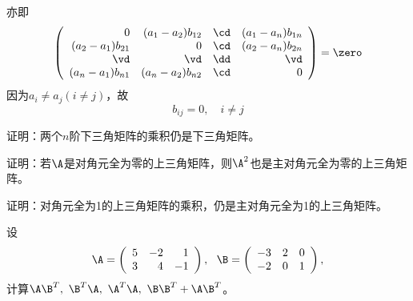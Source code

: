 \begin{frame}
  \begin{footnotesize}
    亦即
    $$
    \left(
    \begin{array}{rrrr}
      0&(a_1-a_2)b_{12}&\cd&(a_1-a_n)b_{1n}\\
      (a_2-a_1)b_{21}&0&\cd&(a_2-a_n)b_{2n}\\
      \vd&\vd&\dd&\vd\\
      (a_n-a_1)b_{n1}&(a_n-a_2)b_{n2}&\cd&0
    \end{array}
    \right)=\zero
    $$
    因为$a_i\ne a_j(i\ne j)$，故
    $$
    b_{ij}=0, \quad i\ne j
    $$
  \end{footnotesize}
\end{frame}

\begin{frame}
  \begin{footnotesize}
    \begin{exampleblock}{30}
      证明：两个$n$阶下三角矩阵的乘积仍是下三角矩阵。
    \end{exampleblock}
  \end{footnotesize}
\end{frame}



\begin{frame}
  \begin{footnotesize}
    \begin{exampleblock}{31}
      证明：若$\A$是对角元全为零的上三角矩阵，则$\A^2$也是主对角元全为零的上三角矩阵。
    \end{exampleblock}
  \end{footnotesize}
\end{frame}



\begin{frame}
  \begin{footnotesize}
    \begin{exampleblock}{32}
      证明：对角元全为1的上三角矩阵的乘积，仍是主对角元全为1的上三角矩阵。
    \end{exampleblock}
  \end{footnotesize}
\end{frame}


\begin{frame}
  \begin{footnotesize}
    \begin{exampleblock}{33}
      设$$\A=\left(
      \begin{array}{rrr}
        5&-2&1\\
        3&4&-1
      \end{array}
      \right),~~\B=\left(
      \begin{array}{rrr}
        -3&2&0\\
        -2&0&1
      \end{array}
      \right),$$
      计算$\A\B^T,~\B^T\A,~\A^T\A,~\B\B^T+\A\B^T$。
    \end{exampleblock}
  \end{footnotesize}
\end{frame}



